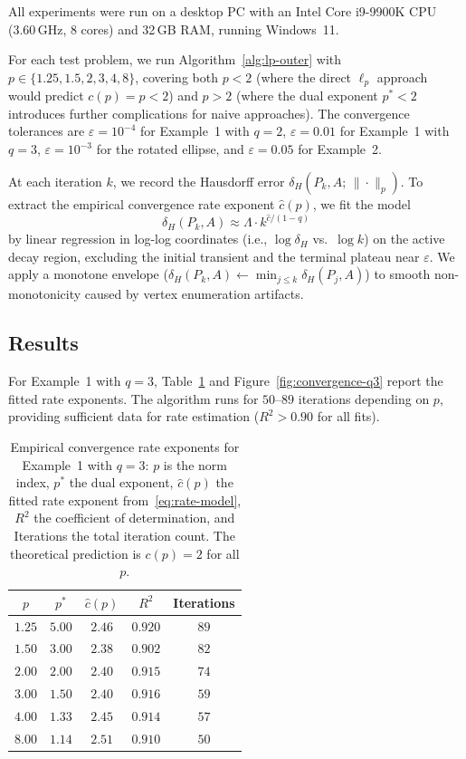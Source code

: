 \documentclass[11pt]{article}
\newcommand{\pstar}{p^*}
\begin{document}
All experiments were run on a desktop PC with an Intel Core i9-9900K CPU (3.60\,GHz, 8 cores) and 32\,GB RAM, running Windows~11.

For each test problem, we run Algorithm~\ref{alg:lp-outer} with $p \in \{1.25, 1.5, 2, 3, 4, 8\}$, covering both $p < 2$ (where the direct $\ell_p$ approach would predict $c(p) = p < 2$) and $p > 2$ (where the dual exponent $\pstar < 2$ introduces further complications for naive approaches). The convergence tolerances are $\varepsilon = 10^{-4}$ for Example~1 with $q = 2$, $\varepsilon = 0.01$ for Example~1 with $q = 3$, $\varepsilon = 10^{-3}$ for the rotated ellipse, and $\varepsilon = 0.05$ for Example~2.

At each iteration $k$, we record the Hausdorff error $\delta_H(P_k, A;\, \|\cdot\|_p)$. To extract the empirical convergence rate exponent $\hat{c}(p)$, we fit the model
\begin{equation}\label{eq:rate-model}
\delta_H(P_k, A) \approx \Lambda \cdot k^{\hat{c}/(1-q)}
\end{equation}
by linear regression in log-log coordinates (i.e., $\log \delta_H$ vs.\ $\log k$) on the active decay region, excluding the initial transient and the terminal plateau near $\varepsilon$. We apply a monotone envelope ($\delta_H(P_k, A) \gets \min_{j \le k} \delta_H(P_j, A)$) to smooth non-monotonicity caused by vertex enumeration artifacts.

\subsection{Results}\label{sec:results}

For Example~1 with $q = 3$, Table~\ref{tab:example1-q3} and Figure~\ref{fig:convergence-q3} report the fitted rate exponents. The algorithm runs for $50$--$89$ iterations depending on $p$, providing sufficient data for rate estimation ($R^2 > 0.90$ for all fits).

\begin{table}[H]
\centering
\caption{Empirical convergence rate exponents for Example~1 with $q = 3$: $p$ is the norm index, $\pstar$ the dual exponent, $\hat{c}(p)$ the fitted rate exponent from~\eqref{eq:rate-model}, $R^2$ the coefficient of determination, and Iterations the total iteration count. The theoretical prediction is $c(p) = 2$ for all $p$.}\label{tab:example1-q3}
\begin{tabular}{@{}ccccc@{}}
\toprule
$p$ & $\pstar$ & $\hat{c}(p)$ & $R^2$ & Iterations \\
\midrule
$1.25$ & $5.00$ & $2.46$ & $0.920$ & $89$ \\
$1.50$ & $3.00$ & $2.38$ & $0.902$ & $82$ \\
$2.00$ & $2.00$ & $2.40$ & $0.915$ & $74$ \\
$3.00$ & $1.50$ & $2.40$ & $0.916$ & $59$ \\
$4.00$ & $1.33$ & $2.45$ & $0.914$ & $57$ \\
$8.00$ & $1.14$ & $2.51$ & $0.910$ & $50$ \\
\bottomrule
\end{tabular}
\end{table}
\end{document}
